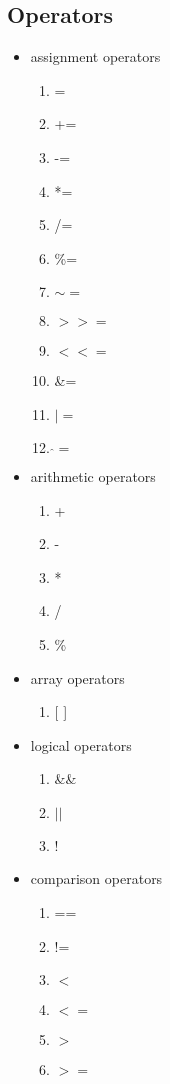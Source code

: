 \documentclass{article}
\newcommand{\subcentersec}[1]{\subsection*{\hfil #1 \hfil}}
\begin{document}
    \subcentersec{Operators}
      \begin{itemize}
        \item{assignment operators}
        \begin{enumerate}
          \item{=}
          \item{+=}
          \item{-=}
          \item{*=}
          \item{/=}
          \item{\%=}
          \item{$ \sim= $ }
          \item{$ >>= $}
          \item{$ <<= $}
          \item{\&=}
          \item{ $ |= $}
          \item{$ \hat{}= $}
        \end{enumerate}

        \item{arithmetic operators}
        \begin{enumerate}
          \item{+}
          \item{-}
          \item{*}
          \item{/}
          \item{\%}
        \end{enumerate}

        \item{array operators}
        \begin{enumerate}
          \item{[ ]}
        \end{enumerate}

        \item{logical operators}
        \begin{enumerate}
          \item{\&\&}
          \item{$ || $}
          \item{!}
        \end{enumerate}

        \item{comparison operators}
        \begin{enumerate}
          \item{==}
          \item{!=}
          \item{$ < $}
          \item{$ <= $}
          \item{$ > $}
          \item{$ >= $}
        \end{enumerate}


\end{itemize}
\end{document}
